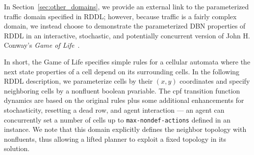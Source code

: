 \documentclass[11pt,a4paper]{article}
\begin{document}
In Section~\ref{sec:other_domains}, we provide an external link to the
parameterized traffic domain specified in RDDL; however, because
traffic is a fairly complex domain, we instead choose to demonstrate
the parameterized DBN properties of RDDL in an interactive,
stochastic, and potentially concurrent version of John H. Conway's
\emph{Game of Life}~\cite{game_of_life}.

In short, the Game of Life specifies simple rules for a cellular
automata where the next state properties of a cell depend on its
surrounding cells.  In the following RDDL description, we parameterize
cells by their $(x,y)$ coordinates and specify neighboring cells
by a nonfluent boolean pvariable.  The cpf transition function
dynamics are based on the original rules plus some additional
enhancements for stochasticity, resetting a dead row, 
and agent interaction --- an agent can concurrently set a number
of cells up to \texttt{max-nondef-actions} defined in an instance.
We note that this domain explicitly defines the neighbor topology with
nonfluents, thus allowing a lifted planner to exploit a fixed
topology in its solution.

\end{document}
